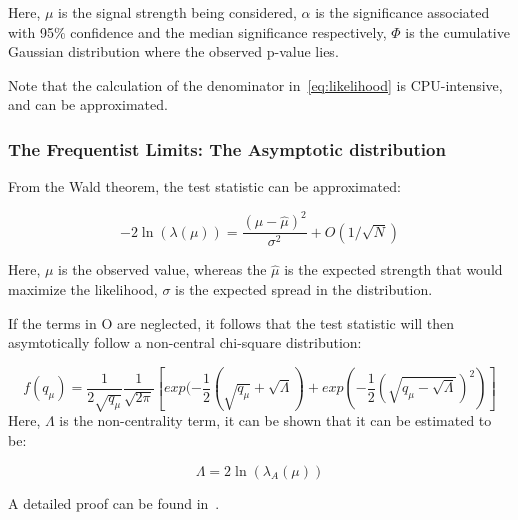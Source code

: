 Here, $\mu$ is the signal strength being considered, $\alpha$ is the significance associated with 95$\%$ confidence and the median significance respectively, $\Phi$ is the cumulative Gaussian distribution where the observed p-value lies.

Note that the calculation of the denominator in~\ref{eq:likelihood} is CPU-intensive, and can be approximated.


\subsubsection{The Frequentist Limits: The Asymptotic distribution}
\label{sec:asymp}


From the Wald theorem, the test statistic can be approximated: 

\begin{equation}
-2\ln(\lambda(\mu))= \frac{(\mu- \hat{\mu})^{2}}{\sigma^{2}} +O(1/\sqrt{N})
\label{eq:wald}
\end{equation}

Here, $\mu$ is the observed value, whereas the $\hat{\mu}$ is the expected strength that would maximize the likelihood, $\sigma$ is the expected spread in the distribution. 

If the terms in O are neglected, it follows that the test statistic will then asymtotically follow a non-central chi-square distribution: 

\begin{equation}
    f(q_{\mu}) = \frac{1}{2\sqrt{q_{\mu}}} \frac{1}{\sqrt{2\pi}} [exp(-\frac{1}{2}(\sqrt{q_{\mu}}+ \sqrt{\Lambda})+ exp(-\frac{1}{2}(\sqrt{q_{\mu}-\sqrt{\Lambda}})^{2})]
\end{equation}
Here, $\Lambda$ is the non-centrality term, it can be shown that it can be estimated to be:

\begin{equation}
    \Lambda=2\ln(\lambda_{A}(\mu))
    \label{eq:Lambda}
\end{equation}

A detailed proof can be found in~\cite{2011}. 







